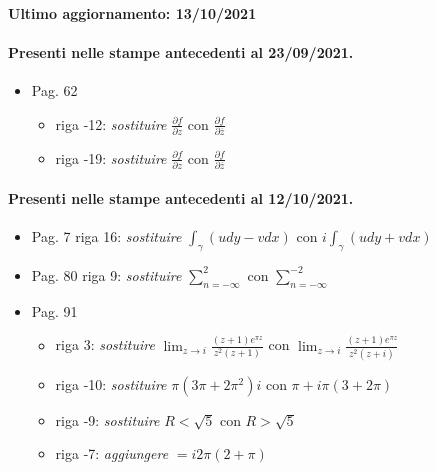 
\paragraph{Ultimo aggiornamento: 13/10/2021}

\paragraph{Presenti nelle stampe antecedenti al 23/09/2021.}
\begin{itemize}
	\item Pag. 62
	\begin{itemize}
		\item riga -12: \emph{sostituire} $\frac{\partial f}{\partial z}$ con $\frac{\partial f}{\partial \overline{z}}$
		\item riga -19: \emph{sostituire} $\frac{\partial f}{\partial z}$ con $\frac{\partial f}{\partial \overline{z}}$
	\end{itemize}
\end{itemize}


\paragraph{Presenti nelle stampe antecedenti al 12/10/2021.}
\begin{itemize}
	\item Pag. 7 riga 16: \emph{sostituire} $\int _{\gamma }( udy-vdx)$ con $i\int _{\gamma }( udy+vdx)$
	\item Pag. 80 riga 9: \emph{sostituire} $\sum ^{2}_{n=-\infty }$ con $\sum ^{-2}_{n=-\infty }$
	\item Pag. 91
	\begin{itemize}
		\item riga 3: \emph{sostituire} $\lim _{z\rightarrow i}\frac{\left( z+1\right) e^{\pi z}}{z^{2}\left( z+1\right)}$ con $\lim _{z\rightarrow i}\frac{\left( z+1\right) e^{\pi z}}{z^{2}\left( z+i\right)}$
		\item riga -10: \emph{sostituire} $\pi \left( 3\pi +2\pi ^{2}\right) i$ con $\pi +i\pi \left( 3 +2\pi\right)$
		\item riga -9: \emph{sostituire} $R< \sqrt{5}$ con $R> \sqrt{5}$
		\item riga -7: \emph{aggiungere} $= i2\pi (2+\pi )$
	\end{itemize}
\end{itemize}